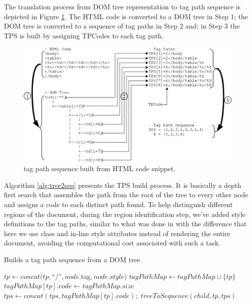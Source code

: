 \documentclass{vldb}
\begin{document}
The translation process from DOM tree representation to tag path sequence is
depicted in Figure \ref{fig:tree2seq}. The HTML code is converted to a DOM tree
in Step 1; the DOM tree is converted to a sequence of tag paths in Step 2 and;
in Step 3 the TPS is built by assigning TPCodes to each tag path. 

\begin{figure}[H]
  \centering
     \includegraphics[width=\columnwidth]{img/tree2seq.jpg}
  \caption{tag path sequence built from HTML code snippet.}
  \label{fig:tree2seq}
\end{figure}

Algorithm \ref{alg:tree2seq} presents the TPS build process.
It is basically a depth first search that assembles the path from the root of
the tree to every other node and assigns a code to each distinct path found. To
help distinguish different regions of the document, during the region
identification step, we've added style definitions to the tag paths, similar to
what was done in \cite{grigalis2013towards} with the difference that here we use class
and in-line style attributes instead of rendering the entire document, avoiding
the computational cost associated with such a task.

\begin{algorithm}[h]
\caption{Builds a tag path sequence from a DOM tree}
\label{alg:tree2seq}
\begin{algorithmic}[1]
\State $tp \leftarrow
concat(tp,$``/''$,node.$tag$,node.style)$\label{lin:alg:tree2seq:a}
 \label{lin:alg:tree2seq:b}
\State $tagPathMap \leftarrow tagPathMap \cup \{tp\}$ 
\State $tagPathMap[tp].code \leftarrow tagPathMap.size$ 
\EndIf \label{lin:alg:tree2seq:c}
\State $tps \leftarrow
concat(tps,tagPathMap[tp].code);$\label{lin:alg:tree2seq:d}
\State $treeToSequence(child,tp,tps)$\label{lin:alg:tree2seq:e} 
\EndFor 
\EndProcedure
\end{algorithmic}
\end{algorithm}
\end{document}

